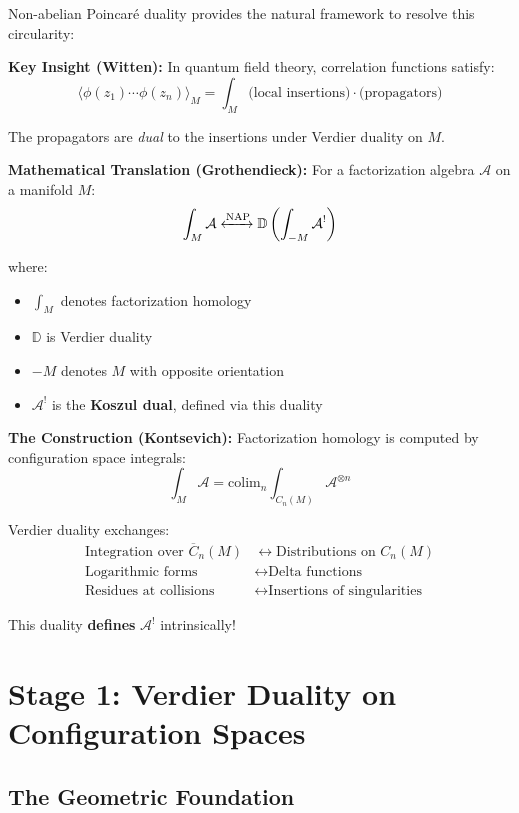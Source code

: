 \begin{principle}\label{prin:NAP-solution}
Non-abelian Poincaré duality provides the natural framework to resolve this circularity:

\textbf{Key Insight (Witten):} In quantum field theory, correlation functions satisfy:
$$\langle \phi(z_1) \cdots \phi(z_n) \rangle_M = \int_M \text{(local insertions)} \cdot \text{(propagators)}$$

The propagators are \emph{dual} to the insertions under Verdier duality on $M$.

\textbf{Mathematical Translation (Grothendieck):} For a factorization algebra $\mathcal{A}$ on a manifold $M$:
$$\int_M \mathcal{A} \xleftrightarrow{\text{NAP}} \mathbb{D}\left(\int_{-M} \mathcal{A}^!\right)$$

where:
\begin{itemize}
\item $\int_M$ denotes factorization homology
\item $\mathbb{D}$ is Verdier duality
\item $-M$ denotes $M$ with opposite orientation
\item $\mathcal{A}^!$ is the \textbf{Koszul dual}, defined via this duality
\end{itemize}

\textbf{The Construction (Kontsevich):} Factorization homology is computed by configuration space integrals:
$$\int_M \mathcal{A} = \text{colim}_n \int_{C_n(M)} \mathcal{A}^{\otimes n}$$

Verdier duality exchanges:
\begin{align*}
\text{Integration over } \overline{C}_n(M) &\leftrightarrow \text{Distributions on } C_n(M)\\
\text{Logarithmic forms} &\leftrightarrow \text{Delta functions}\\
\text{Residues at collisions} &\leftrightarrow \text{Insertions of singularities}
\end{align*}

This duality \textbf{defines} $\mathcal{A}^!$ intrinsically!
\end{principle}

\section{Stage 1: Verdier Duality on Configuration Spaces}

\subsection{The Geometric Foundation}

